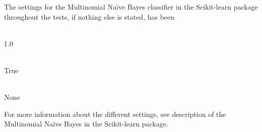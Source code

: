The settings for the Multinomial Naïve Bayes classifier in the Scikit-learn package throughout the tests, if nothing else is stated, has been
\begin{description}
	\item[Alpha] \ \\1.0
	\item[Fit prior]\ \\ True
	\item[Class prior] \ \\None
\end{description}
For more information about the different settings, see description of the Multinomial Naïve Bayes in the Scikit-learn package.